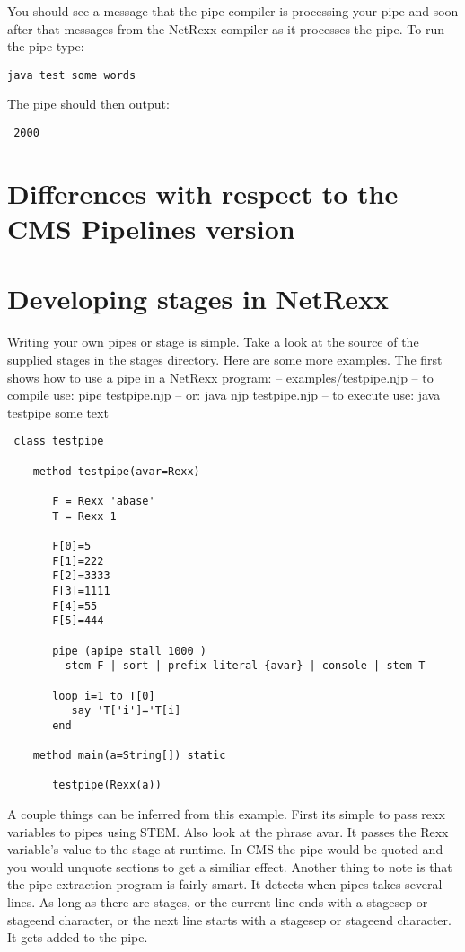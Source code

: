 You should see a message that the pipe compiler is processing your pipe and soon after that messages from the NetRexx compiler as it processes the pipe.
To run the pipe type:
\begin{verbatim}
java test some words
\end{verbatim}
The pipe should then output:
\begin{verbatim}
 2000
\end{verbatim}
\chapter{Differences with respect to the CMS Pipelines version}

\chapter{Developing stages in NetRexx}
Writing your own pipes or stage is simple.  Take a look at the source of the supplied stages in the stages directory.  Here are some more examples.  The first shows how to use a pipe in a NetRexx program:
    -- examples/testpipe.njp
    -- to compile use: pipe testpipe.njp
    --             or: java njp testpipe.njp
    -- to execute use: java testpipe some text
\begin{lstlisting}
 class testpipe

    method testpipe(avar=Rexx)

       F = Rexx 'abase'
       T = Rexx 1

       F[0]=5
       F[1]=222
       F[2]=3333
       F[3]=1111
       F[4]=55
       F[5]=444

       pipe (apipe stall 1000 )
         stem F | sort | prefix literal {avar} | console | stem T

       loop i=1 to T[0]
          say 'T['i']='T[i]
       end

    method main(a=String[]) static

       testpipe(Rexx(a))
\end{lstlisting}
 A couple things can be inferred from this example.  First its simple to pass rexx variables to pipes using STEM.  Also look at the  phrase {avar}. It passes the Rexx variable's value to the stage at runtime.  In CMS the pipe would be quoted and you would unquote sections to get a similiar effect.
Another thing to note is that the pipe extraction program is fairly smart. It detects when pipes takes several lines.  As long as there are stages, or the current line ends with a stagesep or stageend character, or the next line starts with a stagesep or stageend character.  It gets added to the pipe.
